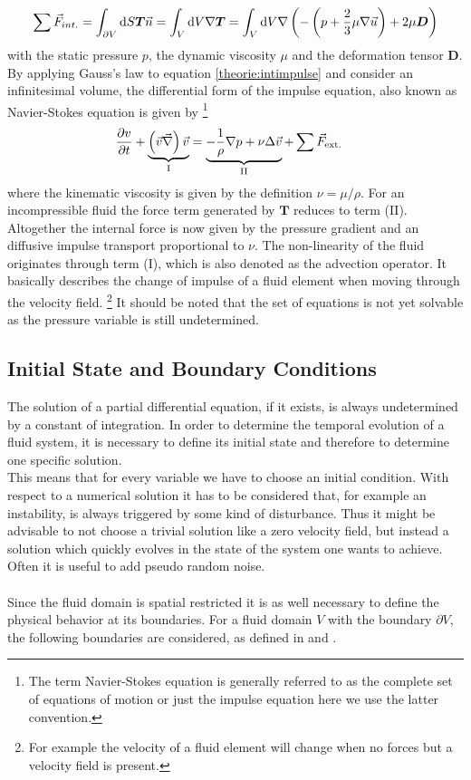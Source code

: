 \begin{align}
    \sum \vec{F}_{int.} = \int_{\partial V}\mathop{}\!\mathrm{d} S \bm{T}\vec{n}  = \int_{V} \mathop{}\!\mathrm{d} V \nabla \bm{T} =
     \int_{V} \mathop{}\!\mathrm{d} V \nabla \left(- \left(p + \frac{2}{3}\mu\nabla\vec{u} \right) + 2\mu \bm{D} \right)
\end{align}
with the static pressure $p$, the dynamic viscosity $\mu$ and the deformation tensor $\bm{D}$.
By applying Gauss's law to equation \ref{theorie:intimpulse} and consider an infinitesimal volume,
the differential form of the impulse equation, also known as Navier-Stokes equation is given by
\footnote{The term Navier-Stokes equation is generally referred to as the complete set of equations of motion or
just the impulse equation here we use the latter convention.}
\begin{align}
    \label{theorie:eqns}
    \pdn[v]{t} + \underbrace{\left(\vec{v} \vec{\nabla}\right) \vec{v}}_{\text{I}} &= \underbrace{- \frac{1}{\rho} \nabla p + \nu \Delta \vec{v}}_{\text{II}} +\sum \vec{F}_{\text{ext.}}
\end{align}
where  the kinematic viscosity is given by the definition $\nu = \mu/\rho$.
For an incompressible fluid the force term generated by $\bm{T}$ reduces to term (II).\\
Altogether the internal force is now given by the pressure gradient and an diffusive impulse transport proportional to $\nu$.
The non-linearity of the fluid originates through term (I), which is also denoted as the advection operator.
It basically describes the change of impulse of a fluid element when moving through the velocity field.
\footnote{For example the velocity of a fluid element will change when no forces but a velocity field is present.}
It should be noted that the set of equations is not yet solvable as the pressure variable is still undetermined.

\subsection{Initial State and Boundary Conditions}

The solution of a partial differential equation, if it exists, is always undetermined by a constant of integration.
In order to determine the temporal evolution of a fluid system, it is necessary to define its initial state and therefore
to determine one specific solution.\\
This means that for every variable we have to choose an initial condition.
With respect to a numerical solution it has to be considered that, for example an instability, is always triggered by some kind of disturbance.
Thus it might be advisable to not choose a trivial solution like a zero velocity field, but instead a solution which quickly evolves in the state
of the system one wants to achieve. Often it is useful to add pseudo random noise.\\
\\
Since the fluid domain is spatial restricted it is as well necessary to define the physical behavior at its boundaries.
For a fluid domain $V$ with the boundary $\partial V$, the following boundaries are considered, as defined in \citep{Griebel1998} and \citep{ferziger99}.

